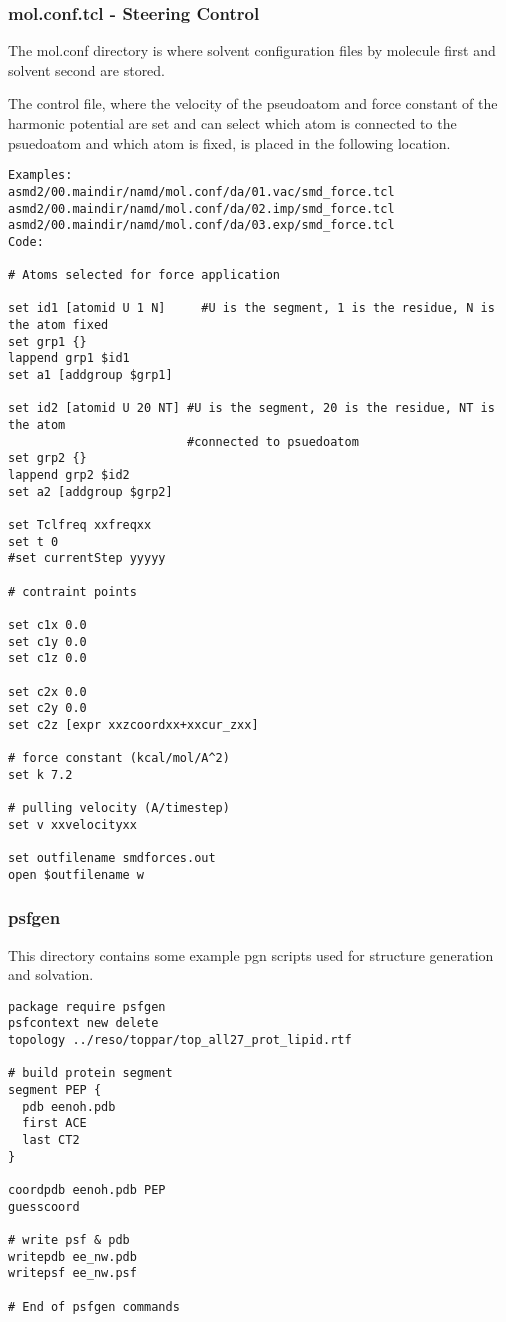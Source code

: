 \documentclass[11pt]{article}
\begin{document}
\subsubsection{mol.conf.tcl - Steering Control}
The mol.conf directory is where solvent configuration files by molecule first and solvent second are stored.

The control file, where the velocity of the pseudoatom and force constant of the harmonic potential are set and can select which atom is connected to the psuedoatom and which atom is fixed, is placed in the following location. 

\begin{verbatim}
Examples:
asmd2/00.maindir/namd/mol.conf/da/01.vac/smd_force.tcl
asmd2/00.maindir/namd/mol.conf/da/02.imp/smd_force.tcl
asmd2/00.maindir/namd/mol.conf/da/03.exp/smd_force.tcl
Code:

# Atoms selected for force application 

set id1 [atomid U 1 N]     #U is the segment, 1 is the residue, N is the atom fixed
set grp1 {}
lappend grp1 $id1
set a1 [addgroup $grp1]

set id2 [atomid U 20 NT] #U is the segment, 20 is the residue, NT is the atom 
                         #connected to psuedoatom
set grp2 {}
lappend grp2 $id2
set a2 [addgroup $grp2]

set Tclfreq xxfreqxx
set t 0
#set currentStep yyyyy

# contraint points

set c1x 0.0
set c1y 0.0
set c1z 0.0

set c2x 0.0
set c2y 0.0
set c2z [expr xxzcoordxx+xxcur_zxx]

# force constant (kcal/mol/A^2)
set k 7.2

# pulling velocity (A/timestep)
set v xxvelocityxx

set outfilename smdforces.out
open $outfilename w
\end{verbatim}

\subsubsection{psfgen}
This directory contains some example pgn scripts used for structure generation and solvation. 
\begin{verbatim}
package require psfgen
psfcontext new delete
topology ../reso/toppar/top_all27_prot_lipid.rtf

# build protein segment
segment PEP {
  pdb eenoh.pdb
  first ACE
  last CT2
}

coordpdb eenoh.pdb PEP
guesscoord

# write psf & pdb
writepdb ee_nw.pdb
writepsf ee_nw.psf

# End of psfgen commands
\end{verbatim}
\end{document}
